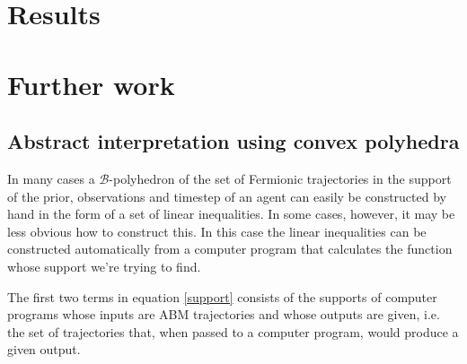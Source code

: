 \documentclass{article}
\begin{document}
\section{Results}

\section{Further work}
\subsection{Abstract interpretation using convex polyhedra}

In many cases a $\mathcal{B}$-polyhedron of the set of Fermionic trajectories in the support of the prior, observations and timestep of an agent can easily be constructed by hand in the form of a set of linear inequalities. In some cases, however, it may be less obvious how to construct this. In this case the linear inequalities can be constructed automatically from a computer program that calculates the function whose support we're trying to find.





The first two terms in equation \eqref{support} consists of the supports of computer programs whose inputs are ABM trajectories and whose outputs are given, i.e. the set of trajectories that, when passed to a computer program, would produce a given output.
\end{document}
